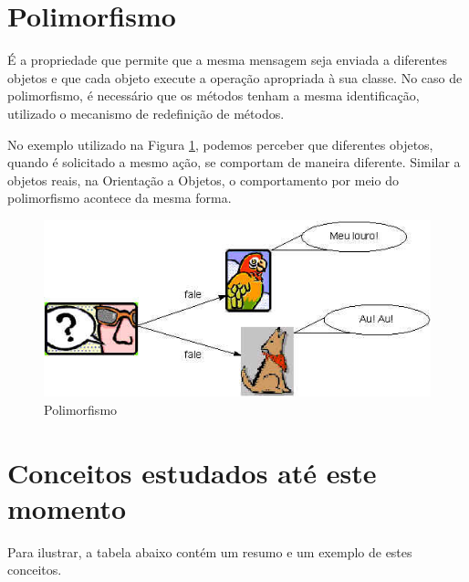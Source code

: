 \section{Polimorfismo}

É a propriedade que permite que a mesma mensagem seja enviada a diferentes objetos e que cada objeto execute a operação apropriada à sua classe. No caso de polimorfismo, é necessário que os métodos tenham a mesma identificação, utilizado o mecanismo de redefinição de métodos.

No exemplo utilizado na Figura \ref{fig:polimorfismo}, podemos perceber que diferentes objetos, quando é solicitado a mesmo ação, se comportam de maneira diferente. Similar a objetos reais, na Orientação a Objetos, o comportamento por meio do polimorfismo acontece da mesma forma. 

\begin{figure}[H]
  \centering
  \includegraphics[scale=0.2]{imagens/polianimais.jpg}
  \caption{Polimorfismo}
  \label{fig:polimorfismo}
\end{figure}

\section{Conceitos estudados até este momento}

Para ilustrar, a tabela abaixo contém um resumo e um exemplo de estes conceitos.

